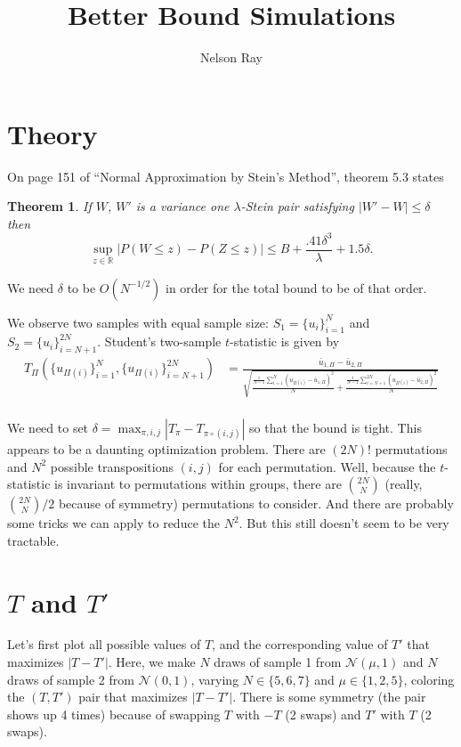 \documentclass{amsart}
\newtheorem{thm}{Theorem}
\begin{document}
\title{Better Bound Simulations}
\author{Nelson Ray}
\maketitle
\section{Theory}
On page 151 of ``Normal Approximation by Stein's Method'', theorem 5.3
states
\begin{thm}
  If $W$, $W'$ is a variance one $\lambda$-Stein pair satisfying
  $|W'-W| \leq \delta$ then
  \begin{equation*}
    \sup_{z \in \mathbb{R}} |P(W \leq z) - P(Z \leq z)| \leq B + 
    \frac{.41\delta^3}{\lambda} + 1.5 \delta.
  \end{equation*}
\end{thm}

We need $\delta$ to be $O(N^{-1/2})$ in order for the total bound to
be of that order.  

We observe two samples with equal sample size: $S_1 = \{u_i\}_{i=1}^N$ and $S_2 =
\{u_i\}_{i=N+1}^{2N}$.  
Student's two-sample $t$-statistic is given by
\begin{align*}
T_{\Pi}(\{u_{\Pi(i)}\}_{i=1}^N, \{u_{\Pi(i)}\}_{i=N+1}^{2N}) 
&= \frac{\bar{u}_{1,\Pi} - \bar{u}_{2,\Pi}}{\sqrt{\frac{\frac{1}{N-1}
      \sum_{i=1}^N(u_{\Pi(i)} - \bar{u}_{1,\Pi})^2}{N} + \frac{\frac{1}{N-1}
      \sum_{i=N+1}^{2N}(u_{\Pi(i)} - \bar{u}_{2,\Pi})^2}{N}}} \\
\end{align*}

We need to set $\delta = \max_{\pi, i, j} |T_{\pi} - T_{\pi \circ (i, j)}|$ 
so that the bound is tight.  This appears to be a daunting
optimization problem.  There are $(2N)!$ permutations and $N^2$
possible transpositions $(i, j)$ for each permutation.  Well, because the
$t$-statistic is invariant to permutations within groups, there are
$\binom{2N}{N}$ (really, $\binom{2N}{N} / 2$ because of symmetry)
permutations to consider.  And there are probably some tricks we can
apply to reduce the $N^2$.  But this still doesn't seem to be very
tractable.

\section{$T$ and $T'$}
Let's first plot all possible values of $T$, and the corresponding
value of $T'$ that maximizes $|T-T'|$.  Here, we make $N$ draws of
sample 1 from $\mathcal{N}(\mu, 1)$ and $N$ draws of sample 2 from
$\mathcal{N}(0, 1)$, varying $N \in \{5, 6, 7\}$ and $\mu \in \{1, 2,
5\}$, coloring the $(T, T')$ pair that maximizes $|T-T'|$.  There is
some symmetry (the pair shows up 4 times) because of swapping $T$ with
$-T$ (2 swaps) and $T'$ with $T$ (2 swaps).
\end{document}
